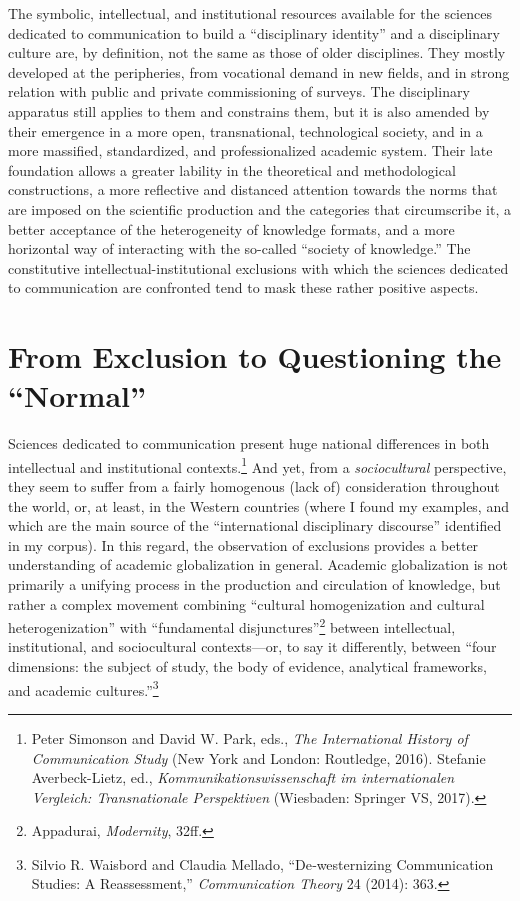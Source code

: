\documentclass{tufte-handout}
\begin{document}
The symbolic, intellectual, and institutional resources available for
the sciences dedicated to communication to build a ``disciplinary
identity'' and a disciplinary culture are, by definition, not the same
as those of older disciplines. They mostly developed at the peripheries,
from vocational demand in new fields, and in strong relation with public
and private commissioning of surveys. The disciplinary apparatus still
applies to them and constrains them, but it is also amended by their
emergence in a more open, transnational, technological society, and in a
more massified, standardized, and professionalized academic system.
Their late foundation allows a greater lability in the theoretical and
methodological constructions, a more reflective and distanced attention
towards the norms that are imposed on the scientific production and the
categories that circumscribe it, a better acceptance of the
heterogeneity of knowledge formats, and a more horizontal way of
interacting with the so-called ``society of knowledge.'' The
constitutive intellectual-institutional exclusions with which the
sciences dedicated to communication are confronted tend to mask these
rather positive aspects.

\hypertarget{from-exclusion-to-questioning-the-normal}{%
\section{From Exclusion to Questioning the
``Normal''}\label{from-exclusion-to-questioning-the-normal}}

Sciences dedicated to communication present huge national differences in
both intellectual and institutional contexts.\footnote{Peter Simonson
  and David W. Park, eds., \emph{The International History of
  Communication Study} (New York and London: Routledge, 2016). Stefanie
  Averbeck\textsc{-}Lietz, ed., \emph{Kommunikationswissenschaft im
  internationalen Vergleich: Transnationale Perspektiven} (Wiesbaden:
  Springer VS, 2017).} And yet, from a \emph{sociocultural} perspective,
they seem to suffer from a fairly homogenous (lack of) consideration
throughout the world, or, at least, in the Western countries (where I
found my examples, and which are the main source of the ``international
disciplinary discourse'' identified in my corpus). In this regard, the
observation of exclusions provides a better understanding of academic
globalization in general. Academic globalization is not primarily a
unifying process in the production and circulation of knowledge, but
rather a complex movement combining ``cultural homogenization and
cultural heterogenization'' with ``fundamental disjunctures''\footnote{Appadurai,
  \emph{Modernity}, 32ff.} between intellectual, institutional, and
sociocultural contexts---or, to say it differently, between ``four
dimensions: the subject of study, the body of evidence, analytical
frameworks, and academic cultures.''\footnote{Silvio R. Waisbord and
  Claudia Mellado, ``De‐westernizing Communication Studies: A
  Reassessment,'' \emph{Communication Theory} 24 (2014): 363.}
\end{document}
